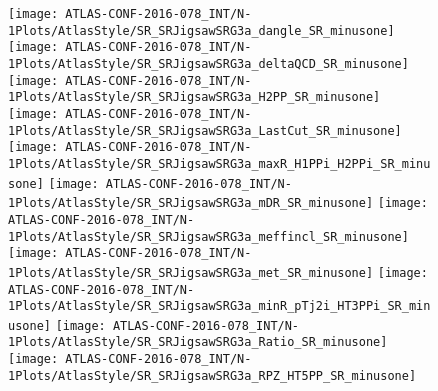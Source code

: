 \clearpage
\begin{figure}[tbph]
\begin{center}
\texttt{[image: ATLAS-CONF-2016-078\_INT/N-1Plots/AtlasStyle/SR\_SRJigsawSRG3a\_dangle\_SR\_minusone]}
\texttt{[image: ATLAS-CONF-2016-078\_INT/N-1Plots/AtlasStyle/SR\_SRJigsawSRG3a\_deltaQCD\_SR\_minusone]}
\texttt{[image: ATLAS-CONF-2016-078\_INT/N-1Plots/AtlasStyle/SR\_SRJigsawSRG3a\_H2PP\_SR\_minusone]}
\texttt{[image: ATLAS-CONF-2016-078\_INT/N-1Plots/AtlasStyle/SR\_SRJigsawSRG3a\_LastCut\_SR\_minusone]}
\texttt{[image: ATLAS-CONF-2016-078\_INT/N-1Plots/AtlasStyle/SR\_SRJigsawSRG3a\_maxR\_H1PPi\_H2PPi\_SR\_minusone]}
\texttt{[image: ATLAS-CONF-2016-078\_INT/N-1Plots/AtlasStyle/SR\_SRJigsawSRG3a\_mDR\_SR\_minusone]}
\texttt{[image: ATLAS-CONF-2016-078\_INT/N-1Plots/AtlasStyle/SR\_SRJigsawSRG3a\_meffincl\_SR\_minusone]}
\texttt{[image: ATLAS-CONF-2016-078\_INT/N-1Plots/AtlasStyle/SR\_SRJigsawSRG3a\_met\_SR\_minusone]}
\texttt{[image: ATLAS-CONF-2016-078\_INT/N-1Plots/AtlasStyle/SR\_SRJigsawSRG3a\_minR\_pTj2i\_HT3PPi\_SR\_minusone]}
\texttt{[image: ATLAS-CONF-2016-078\_INT/N-1Plots/AtlasStyle/SR\_SRJigsawSRG3a\_Ratio\_SR\_minusone]}
\texttt{[image: ATLAS-CONF-2016-078\_INT/N-1Plots/AtlasStyle/SR\_SRJigsawSRG3a\_RPZ\_HT5PP\_SR\_minusone]}
\end{center}
\caption{}
\label{fig:SR_SRJigsawSRG2b_met_SR_minusone}
\end{figure}

\begin{figure}[tbph]
\begin{center}
\end{center}
\caption{}
\label{fig:SR_SRJigsawSRG3a_H2PP_SR_minusone}
\end{figure}


